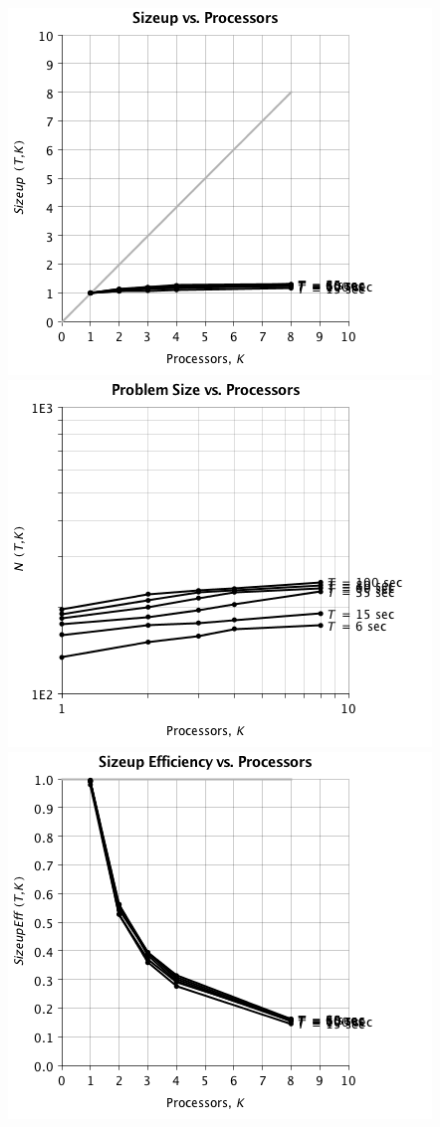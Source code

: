 \begin{figure}
\begin{center}
\includegraphics[scale=0.35]{./chapter_optimize/t1um_size_2.png}
\includegraphics[scale=0.35]{./chapter_optimize/t1um_size_3.png}
\includegraphics[scale=0.35]{./chapter_optimize/t1um_size_1.png}

\end{center}
\end{figure}
